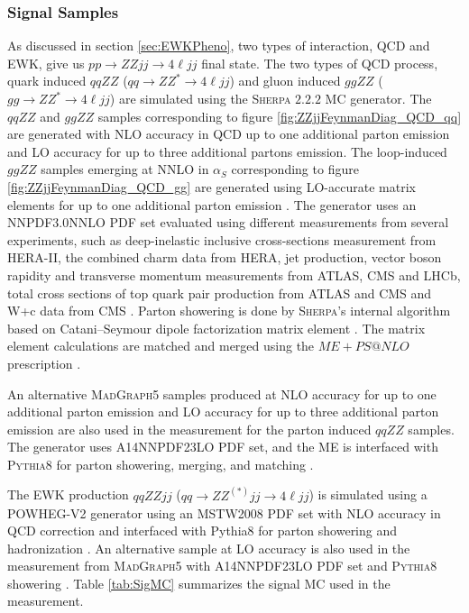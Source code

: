 \subsubsection{Signal Samples}
\label{subsubsec:SigSamples}
As discussed in section \ref{sec:EWKPheno}, two types of interaction, QCD and EWK, give us $pp \rightarrow ZZjj\rightarrow 4 \ell jj$ final state. The two types of QCD process, quark induced $qqZZ$ ($qq \rightarrow ZZ^* \rightarrow 4 \ell jj$) and gluon induced $ggZZ$ ($gg \rightarrow ZZ^* \rightarrow 4\ell jj$) are simulated using the \textsc{Sherpa} $2.2.2$ MC generator. The $qqZZ$ and $ggZZ$ samples corresponding to figure \ref{fig:ZZjjFeynmanDiag_QCD_qq} are generated with NLO accuracy in QCD up to one additional parton emission and LO accuracy for up to three additional partons emission. The loop-induced $ggZZ$ samples emerging at NNLO in $\alpha_{S}$ corresponding to figure \ref{fig:ZZjjFeynmanDiag_QCD_gg} are generated using LO-accurate matrix elements for up to one additional parton emission \cite{EventGenWithSherpa}. The generator uses an NNPDF3.0NNLO PDF set evaluated using different measurements from several experiments, such as deep-inelastic inclusive cross-sections measurement from HERA-II, the combined charm data from HERA, jet production, vector boson rapidity and transverse momentum measurements from ATLAS, CMS and LHCb, total cross sections of top quark pair production from ATLAS and CMS and W+c data from CMS \cite{PDFForRunII}. Parton showering is done by \textsc{Sherpa}'s internal algorithm based on Catani–Seymour dipole factorization matrix element \cite{SherpaPS}. The matrix element calculations are matched and merged using the $ME+PS@NLO$ prescription \cite{PSMatching}. 

An alternative \textsc{MadGraph5} samples produced at NLO accuracy for up to one additional parton emission and LO accuracy for up to three additional parton emission \cite{MADGRAPHNLO} are also used in the measurement for the parton induced $qqZZ$ samples. The generator uses A14NNPDF23LO PDF set, and the ME is interfaced with \textsc{Pythia8} for parton showering, merging, and matching \cite{Pythia8}. 

The EWK production $qqZZjj$ ($qq \rightarrow ZZ^{(*)}jj \rightarrow 4 \ell jj$) is simulated using a POWHEG-V2 generator using an MSTW2008 PDF set with NLO accuracy in QCD correction and interfaced with Pythia8 for parton showering and hadronization \cite{PowhegV2}. An alternative sample at LO accuracy is also used in the measurement from \textsc{MadGraph5} with A14NNPDF23LO PDF set and \textsc{Pythia8} showering \cite{MADGRAPHNLO}. Table \ref{tab:SigMC} summarizes the signal MC used in the measurement. 

